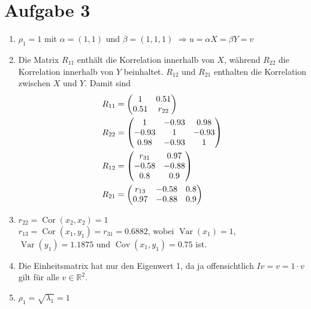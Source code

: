 \documentclass{article}
\DeclareMathOperator{\Var}{Var}
\DeclareMathOperator{\Cov}{Cov}
\DeclareMathOperator{\Cor}{Cor}
\begin{document}
	\section*{Aufgabe 3}
	\begin{enumerate}[label=(\alph*)]
		\item $\rho_1=1$ mit $\alpha=(1,1)$ und $\beta=(1,1,1)$ $\Rightarrow u=\alpha X = \beta Y=v$
		\item Die Matrix $R_{11}$ enthält die Korrelation innerhalb von $X$, während $R_{22}$ die Korrelation innerhalb von $Y$ beinhaltet. $R_{12}$ und $R_{21}$ enthalten die Korrelation zwischen $X$ und $Y$. Damit sind
		\begin{align}
			R_{11} &= \begin{pmatrix}
				1 & 0.51 \\ 0.51 & r_{22}
			\end{pmatrix} \notag \\
			R_{22} &= \begin{pmatrix}
				1 & -0.93 & 0.98 \\ -0.93 & 1 & -0.93 \\ 0.98 & -0.93 & 1
			\end{pmatrix} \notag \\
			R_{12} &= \begin{pmatrix}
				r_{31} & 0.97 \\ -0.58 & -0.88 \\ 0.8 & 0.9
			\end{pmatrix} \notag \\
			R_{21} &= \begin{pmatrix}
				r_{13} & -0.58 & 0.8 \\ 0.97 & -0.88 & 0.9
			\end{pmatrix} \notag
		\end{align}
		\item $r_{22} = \Cor(x_2,x_2) = 1$ \\
		$r_{13} = \Cor(x_1,y_1) = r_{31} = 0.6882$, wobei $\Var(x_1) = 1$, $\Var(y_1) = 1.1875$ und $\Cov(x_1,y_1)=0.75$ ist.
		\item Die Einheitsmatrix hat nur den Eigenwert 1, da ja offensichtlich $Iv = v = 1\cdot v$ gilt für alle $v\in\mathbb{R}^2$.
		\item $\rho_1=\sqrt{\lambda_1} = 1$
	\end{enumerate}
\end{document}

